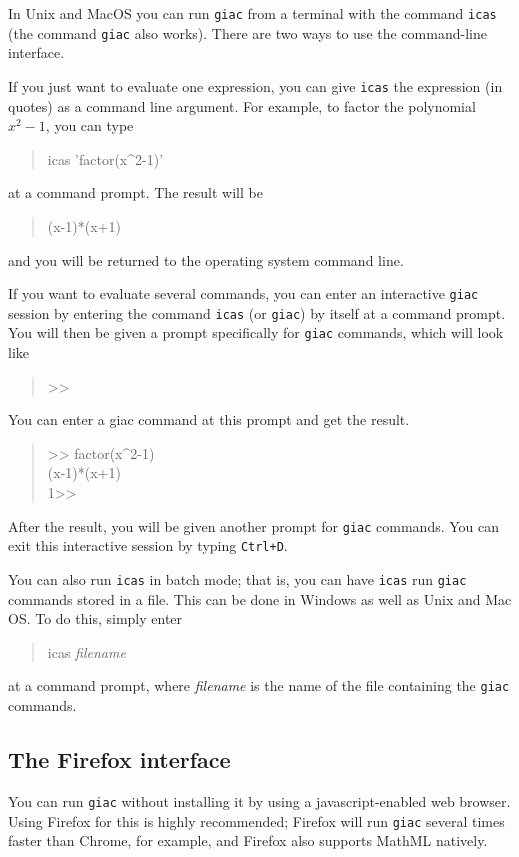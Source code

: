 \documentclass[a4paper,11pt]{book}
\newenvironment{giaccmd}
{\begin{quote}\ttfamily}
{\end{quote}}
\begin{document}
In Unix and MacOS you can run \texttt{giac} from a terminal with
the command \texttt{icas} (the command \texttt{giac} also works).
There are two ways to use the command-line interface.

If you just want to evaluate one expression, you can give
\texttt{icas} the expression (in quotes) as a command line argument.
For example, to factor the polynomial $x^2-1$, you can type
\begin{giaccmd}
  icas 'factor(x\^{}2-1)'
\end{giaccmd}
at a command prompt.  The result will be
\begin{giaccmd}
  (x-1)*(x+1)
\end{giaccmd}
and you will be returned to the operating system command line.

If you want to evaluate several commands, you can enter an interactive
\texttt{giac} session by entering the command
\texttt{icas} (or \texttt{giac}) by itself at a command prompt.  You
will then be given a prompt specifically for \texttt{giac} commands,
which will look like
\begin{giaccmd}
  0>{}>
\end{giaccmd}
You can enter a giac command at this prompt and get the result.
\begin{giaccmd}
0>{}> factor(x\^{}2-1)\\
(x-1)*(x+1)\\
1>{}>
\end{giaccmd}
After the result, you will be given another prompt for \texttt{giac}
commands.  You can exit this interactive session by typing
\texttt{Ctrl+D}.

You can also run \texttt{icas} in batch mode; that is, 
you can have \texttt{icas} run \texttt{giac} commands stored in a
file.  This can be done in Windows as well as Unix and Mac OS.
To do this, simply enter 
\begin{giaccmd}
  icas \textit{filename}
\end{giaccmd}
at a command prompt, where \textit{filename} is the name of the file
containing the \texttt{giac} commands.

\subsection{The Firefox interface}

You can run \texttt{giac} without installing it by using a
javascript-enabled web browser.  Using Firefox for this is highly
recommended; Firefox will run \texttt{giac} several times faster than
Chrome, for example, and Firefox also supports MathML natively.
\end{document}
